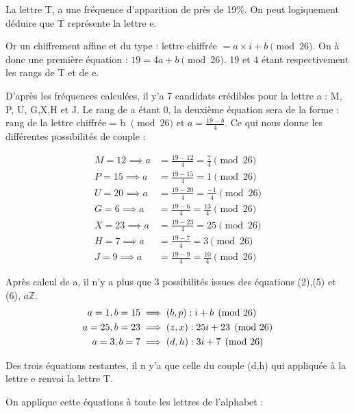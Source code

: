 \documentclass[a4paper,10pt]{article}
\newcommand{\Z}{\mathbb{Z}}
\begin{document}
\begin{enumerate}
\begin{tabular}{|c|c|c|}
	\end{tabular} 	

La lettre T, a une fréquence d'apparition de près de 19\%. On peut logiquement déduire que T représente la lettre e.

Or un chiffrement affine et du type : lettre chiffrée $= a\times i + b \pmod{26}$.
On à donc une première équation : $19=4a+b \pmod{26}$. 19 et 4 étant respectivement les rangs de T et de e.

D'après les fréquences calculées, il y'a 7 candidats crédibles pour la lettre a : M, P, U, G,X,H et J.
Le rang de a étant 0, la deuxième équation sera de la forme : rang de la lettre chiffrée = b $\pmod{26}$ et $a=\frac{19-b}{4}$. Ce qui nous donne les différentes possibilités de couple :

\begin{align}
 M=12 \implies a&=\frac{19-12}{4}=\frac{7}{4}\pmod{26} \\
 P=15 \implies a&=\frac{19-15}{4}=1\pmod{26}\\
 U=20 \implies a&=\frac{19-20}{4}=\frac{-1}{4}\pmod{26}\\
 G=6 \implies a&=\frac{19-6}{4}=\frac{13}{4}\pmod{26}\\
 X=23 \implies a&=\frac{19-23}{4}=25\pmod{26}\\
 H=7 \implies a&=\frac{19-7}{4}=3\pmod{26}\\
 J=9 \implies a&=\frac{19-9}{4}=\frac{10}{4}\pmod{26}
\end{align}

Après calcul de a, il n'y a plus que 3 possibilités issues des équations (2),(5) et (6), $a \Z$.
\begin{align}
a=1,b=15 &\implies (b,p) : i+b \pmod{26} \notag \\
a=25,b=23 &\implies (z,x):25i+23 \pmod{26} \notag \\
a=3,b=7 &\implies (d,h) : 3i+7 \pmod{26} \notag 
\end{align}

Des trois équations restantes, il n y'a que celle du couple (d,h) qui appliquée à la lettre e renvoi la lettre T.

On applique cette équations à toute les lettres de l'alphabet :


\end{enumerate}
\end{document}
